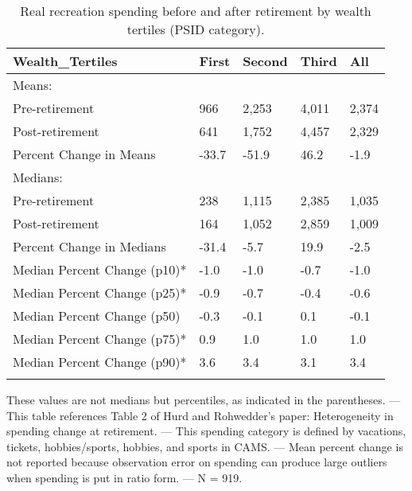 \begin{table}[tbp] \centering
{}

\caption{Real recreation spending before and after retirement by wealth tertiles (PSID category).}
\begin{tabularx}{\textwidth}{lCCCC}

\toprule
{Wealth\_Tertiles}&{First}&{Second}&{Third}&{All} \tabularnewline
\midrule\addlinespace[1.5ex]
Means:&&&& \tabularnewline
\midrule Pre-retirement&966&2,253&4,011&2,374 \tabularnewline
Post-retirement&641&1,752&4,457&2,329 \tabularnewline
Percent Change in Means&-33.7&-51.9&46.2&-1.9 \tabularnewline
\midrule Medians:&&&& \tabularnewline
\midrule Pre-retirement&238&1,115&2,385&1,035 \tabularnewline
Post-retirement&164&1,052&2,859&1,009 \tabularnewline
Percent Change in Medians&-31.4&-5.7&19.9&-2.5 \tabularnewline
Median Percent Change (p10)*&-1.0&-1.0&-0.7&-1.0 \tabularnewline
Median Percent Change (p25)*&-0.9&-0.7&-0.4&-0.6 \tabularnewline
Median Percent Change (p50)&-0.3&-0.1&0.1&-0.1 \tabularnewline
Median Percent Change (p75)*&0.9&1.0&1.0&1.0 \tabularnewline
Median Percent Change (p90)*&3.6&3.4&3.1&3.4 \tabularnewline
\bottomrule \addlinespace[1.5ex]

\end{tabularx}
\begin{flushleft}
\footnotesize *These values are not medians but percentiles, as indicated in the parentheses. \linebreak --- \linebreak This table references Table 2 of Hurd and Rohwedder's paper: Heterogeneity in spending change at retirement. \linebreak --- \linebreak This spending category is defined by vacations, tickets, hobbies/sports, hobbies, and sports in CAMS. \linebreak --- \linebreak Mean percent change is not reported because observation error on spending can produce large outliers when spending is put in ratio form. \linebreak --- \linebreak N = 919.
\end{flushleft}
\end{table}
